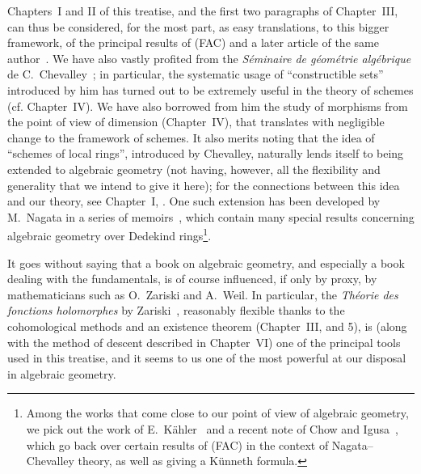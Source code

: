 Chapters~I and II of this treatise, and the first two paragraphs of Chapter~III, can thus be considered, for the most part, as easy translations, to this bigger framework, of the principal results of (FAC) and a later article of the same author~\cite{I-15}.
We have also vastly profited from the \emph{S\'eminaire de g\'eom\'etrie alg\'ebrique} de C.~Chevalley~\cite{I-1};
in particular, the systematic usage of ``constructible sets'' introduced by him has turned out to be extremely useful in the theory of schemes (cf. Chapter~IV).
We have also borrowed from him the study of morphisms from
the point of view of dimension (Chapter~IV), that translates with negligible change to the framework of schemes.
It also merits noting that the idea of ``schemes of local rings'', introduced by Chevalley, naturally lends itself to being extended to algebraic geometry (not having, however, all the flexibility and generality that we intend to give it here);
for the connections between this idea and our theory, see Chapter~I, .
One such extension has been developed by M.~Nagata in a series of memoirs~\cite{I-9}, which contain many special results concerning algebraic geometry over Dedekind rings\footnote{Among the works that come close to our point of view of algebraic geometry, we pick out the work of E.~K\"ahler~\cite{I-22} and a recent note of Chow and Igusa~\cite{I-3}, which go back over certain results of (FAC) in the context of Nagata--Chevalley theory, as well as giving a K\"unneth formula.}.

\sectionbreak

It goes without saying that a book on algebraic geometry, and especially a book dealing with the fundamentals, is of course influenced, if only by proxy, by mathematicians such as O.~Zariski and A.~Weil.
In particular, the \emph{Th\'eorie des fonctions holomorphes} by Zariski~\cite{I-20}, reasonably flexible thanks to the cohomological methods and an existence theorem (Chapter~III, \textsection{} and 5), is (along with the method of descent described in Chapter~VI) one of the principal tools used in this treatise, and it seems to us one of the most powerful at our disposal in algebraic geometry.

